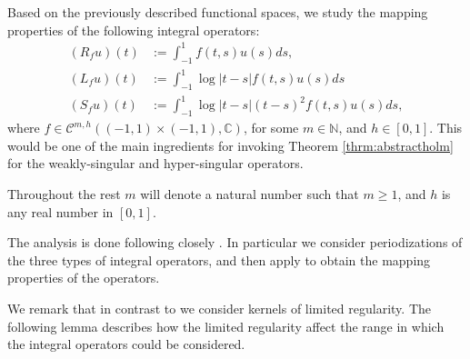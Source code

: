 \documentclass{article}
\newcommand{\IC}{{\mathbb C}}
\newcommand{\IN}{{\mathbb N}}
\newcommand{\cmspaceh}[4]{\mathcal{C}^{#1,#2} \left( #3, #4 \right)}
\begin{document}
Based on the previously described functional spaces, we study the mapping properties of the following integral operators:
\begin{align*}
(R_f u)(t) &:= \int_{-1}^1f(t,s) u(s) ds,\\
(L_fu)(t) &:= \int_{-1}^1 \log|t-s| f(t,s) u(s) ds\\
(S_f u)(t) &:= \int_{-1}^1 \log|t-s| (t-s)^2 f(t,s)u(s)ds,
\end{align*}
where $f \in \cmspaceh{m}{h}{(-1,1)\times(-1,1)}{\IC}$, for some $m \in \IN$, and $h \in [0,1]$. This would be one of the main ingredients for invoking Theorem \ref{thrm:abstractholm} for the weakly-singular and hyper-singular operators.

Throughout the rest $m$ will denote a natural number such that $m \geq 1$, and $h$ is any real number in $[0,1]$.

The analysis is done following closely \cite[Chapters 6 and 11]{saranen2013periodic}. In particular we consider periodizations of the three types of integral operators, and then apply \cite[Theorem 6.1.3]{saranen2013periodic} to obtain the mapping properties of the operators. 

We remark that in contrast to \cite[Chapter 6]{saranen2013periodic}  we consider kernels of limited regularity. The following lemma describes how the limited regularity affect the range in which the integral operators could be considered.  
\end{document}
